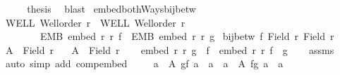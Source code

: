 \begin{isabellebody}
\isanewline
\ \ \isamarkupfalse%
\ \isamarkupfalse%
\ {\isacharquery}{\kern0pt}thesis\ \isamarkupfalse%
\ blast\isanewline
{}\isamarkupfalse%
%
\endisatagproof
{\isafoldproof}%
%
\isadelimproof
\isanewline
%
\endisadelimproof
\isanewline
{}\isamarkupfalse%
\ embed{\isacharunderscore}{\kern0pt}bothWays{\isacharunderscore}{\kern0pt}bij{\isacharunderscore}{\kern0pt}betw{\isacharcolon}{\kern0pt}\isanewline
{}\ WELL{\isacharcolon}{\kern0pt}\ {\isachardoublequoteopen}Well{\isacharunderscore}{\kern0pt}order\ r{\isachardoublequoteclose}\ \ WELL{\isacharprime}{\kern0pt}{\isacharcolon}{\kern0pt}\ {\isachardoublequoteopen}Well{\isacharunderscore}{\kern0pt}order\ r{\isacharprime}{\kern0pt}{\isachardoublequoteclose}\ \isanewline
\ \ \ \ \ \ \ \ EMB{\isacharcolon}{\kern0pt}\ {\isachardoublequoteopen}embed\ r\ r{\isacharprime}{\kern0pt}\ f{\isachardoublequoteclose}\ \ EMB{\isacharprime}{\kern0pt}{\isacharcolon}{\kern0pt}\ {\isachardoublequoteopen}embed\ r{\isacharprime}{\kern0pt}\ r\ g{\isachardoublequoteclose}\isanewline
{}\ {\isachardoublequoteopen}bij{\isacharunderscore}{\kern0pt}betw\ f\ {\isacharparenleft}{\kern0pt}Field\ r{\isacharparenright}{\kern0pt}\ {\isacharparenleft}{\kern0pt}Field\ r{\isacharprime}{\kern0pt}{\isacharparenright}{\kern0pt}{\isachardoublequoteclose}\isanewline
%
\isadelimproof
%
\endisadelimproof
%
\isatagproof
{}\isamarkupfalse%
{\isacharminus}{\kern0pt}\isanewline
\ \ \isamarkupfalse%
\ {\isacharquery}{\kern0pt}A\ {\isacharequal}{\kern0pt}\ {\isachardoublequoteopen}Field\ r{\isachardoublequoteclose}\ \ \isamarkupfalse%
\ {\isacharquery}{\kern0pt}A{\isacharprime}{\kern0pt}\ {\isacharequal}{\kern0pt}\ {\isachardoublequoteopen}Field\ r{\isacharprime}{\kern0pt}{\isachardoublequoteclose}\isanewline
\ \ \isamarkupfalse%
\ {\isachardoublequoteopen}embed\ r\ r\ {\isacharparenleft}{\kern0pt}g\ {\isasymcirc}\ f{\isacharparenright}{\kern0pt}\ {\isasymand}\ embed\ r{\isacharprime}{\kern0pt}\ r{\isacharprime}{\kern0pt}\ {\isacharparenleft}{\kern0pt}f\ {\isasymcirc}\ g{\isacharparenright}{\kern0pt}{\isachardoublequoteclose}\isanewline
\ \ \isamarkupfalse%
\ assms\ \isamarkupfalse%
\ {\isacharparenleft}{\kern0pt}auto\ simp\ add{\isacharcolon}{\kern0pt}\ comp{\isacharunderscore}{\kern0pt}embed{\isacharparenright}{\kern0pt}\isanewline
\ \ \isamarkupfalse%
\ {}{\isacharcolon}{\kern0pt}\ {\isachardoublequoteopen}{\isacharparenleft}{\kern0pt}{\isasymforall}a\ {\isasymin}\ {\isacharquery}{\kern0pt}A{\isachardot}{\kern0pt}\ g{\isacharparenleft}{\kern0pt}f\ a{\isacharparenright}{\kern0pt}\ {\isacharequal}{\kern0pt}\ a{\isacharparenright}{\kern0pt}\ {\isasymand}\ {\isacharparenleft}{\kern0pt}{\isasymforall}a{\isacharprime}{\kern0pt}\ {\isasymin}\ {\isacharquery}{\kern0pt}A{\isacharprime}{\kern0pt}{\isachardot}{\kern0pt}\ f{\isacharparenleft}{\kern0pt}g\ a{\isacharprime}{\kern0pt}{\isacharparenright}{\kern0pt}\ {\isacharequal}{\kern0pt}\ a{\isacharprime}{\kern0pt}{\isacharparenright}{\kern0pt}{\isachardoublequoteclose}\isanewline

\end{isabellebody}
